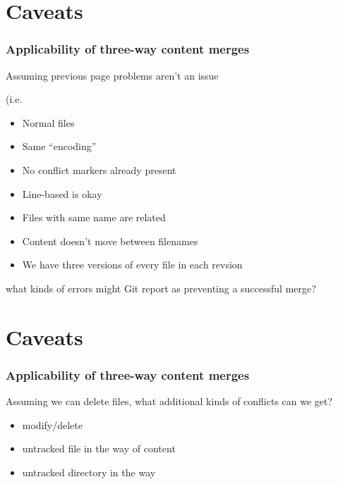 \documentclass[t]{beamer}
\begin{document}
\section{Caveats}
\begin{frame}
  \frametitle{Applicability of three-way content merges}

  Assuming previous page problems aren't an issue {\scriptsize (i.e.\
  \begin{itemize}
    \item Normal files
    \item Same ``encoding''
    \item No conflict markers already present
    \item Line-based is okay
    \item Files with same name are related
    \item Content doesn't move between filenames
    \item We have three versions of every file in each revsion
  \end{itemize}
  } what kinds of errors might Git report as preventing a
  successful merge?


\end{frame}


\section{Caveats}
\begin{frame}
  \frametitle{Applicability of three-way content merges}

  Assuming we can delete files, what additional kinds of conflicts can we get?
  \pause
  \begin{itemize}
    \item modify/delete
    \pause
    \item untracked file in the way of content
    \pause
    \item untracked directory in the way
  \end{itemize}

\end{frame}
\end{document}
